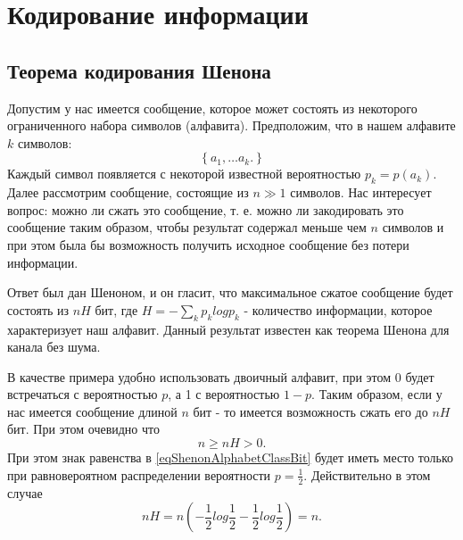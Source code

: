 \section{Кодирование информации}

\subsection{Теорема кодирования Шенона}
Допустим у нас имеется сообщение, которое может состоять из
некоторого ограниченного набора символов (алфавита). Предположим, что
в нашем алфавите $k$ символов:
\begin{equation}
\left\{
a_1, \dots a_k.
\right\}
\label{eqShenonAlphabetClass}
\end{equation}
Каждый символ появляется с некоторой известной вероятностью
$p_k = p\left(a_k\right)$. Далее рассмотрим сообщение, состоящие из $n
\gg 1$ символов. Нас интересует вопрос: можно ли сжать это сообщение,
т. е. можно ли закодировать это сообщение таким образом, чтобы
результат содержал меньше чем $n$ символов и при этом была бы
возможность получить исходное сообщение без потери информации.

Ответ был дан Шеноном, и он гласит, что максимальное сжатое сообщение
будет состоять из $n H$ бит, где $H = - \sum_k p_k log p_k$ -
количество информации, которое характеризует наш алфавит. Данный
результат известен как теорема Шенона для канала без шума.

В качестве примера удобно использовать двоичный алфавит, при этом 0
будет встречаться с вероятностью $p$, а 1 с вероятностью $1 -
p$. Таким образом, если у нас имеется сообщение длиной $n$ бит - то
имеется возможность сжать его до $n H$ бит. При этом очевидно что 
\begin{equation}
n \ge n H > 0.
\label{eqShenonAlphabetClassBit}
\end{equation}
При этом знак равенства в \eqref{eqShenonAlphabetClassBit} будет иметь
место только при равновероятном распределении вероятности $p =
\frac{1}{2}$. Действительно в этом случае 
\[
n H = n \left(- \frac{1}{2} log \frac{1}{2} - \frac{1}{2} log
  \frac{1}{2}\right) = n.
\]

